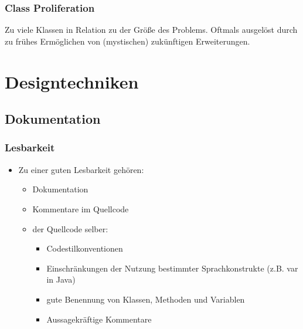 \documentclass[
    ngerman,
    color=3b,
    summary,
    boxarc,
    main,
]{rubos-tuda-template}
\begin{document}
\subsubsection{Class Proliferation}
Zu viele Klassen in Relation zu der Größe des Problems. Oftmals ausgelöst durch zu frühes Ermöglichen von (mystischen) zukünftigen Erweiterungen.

\clearpage
\section{Designtechniken}
\subsection{Dokumentation}
\subsubsection{Lesbarkeit}\begin{itemize}
    \item Zu einer guten Lesbarkeit gehören:\begin{itemize}
              \item Dokumentation
              \item Kommentare im Quellcode
              \item der Quellcode selber:\begin{itemize}
                        \item Codestilkonventionen
                        \item Einschränkungen der Nutzung bestimmter Sprachkonstrukte (z.B. var in Java)
                        \item gute Benennung von Klassen, Methoden und Variablen
                        \item Aussagekräftige Kommentare
                    \end{itemize}
          \end{itemize}
\end{itemize}
\end{document}
